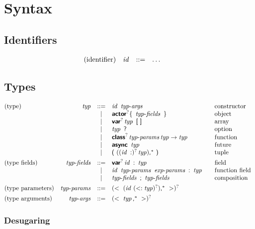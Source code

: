 
\section{Syntax}

\subsection*{Identifiers}

$$
\begin{array}{@{}lrcl@{\qquad}l}
\text{(identifier)} & \x{id} &::=&
  \dots \\
\end{array}
$$


\subsection*{Types}

$$
\begin{array}{@{}lrcl@{\qquad}l}
\text{(type)} & \x{typ} &::=&
  \x{id}~\x{typ-args}
    & \text{constructor} \\&&|&
  \KK{actor}^? \K\{~\x{typ-fields}~\K\}
    & \text{object} \\&&|&
  \KK{var}^? \x{typ}~\K[~\K]
    & \text{array} \\&&|&
  \x{typ}~\K?
    & \text{option} \\&&|&
 \KK{class}^?  \x{typ-params} \x{typ} \Kto \x{typ}
    & \text{function} \\&&|&
  \KK{async}~\x{typ}
    & \text{future} \\&&|&
  \K(~( (\x{id}~\K:)^? \x{typ})\K,^\ast~\K)
    & \text{tuple} \\
[1ex]
\text{(type fields)} & \x{typ-fields} &::=&
  \KK{var}^? \x{id}~\K:~\x{typ}
    & \text{field} \\&&|&
  \x{id}~\x{typ-params}~\x{exp-params}~\K:~\x{typ}
    & \text{function field} \\&&|&
  \x{typ-fields}~\K;~\x{typ-fields}
    & \text{composition} \\
[1ex]
\text{(type parameters)} & \x{typ-params} &::=&
  (\Klt~(\x{id}~(\Ksub \x{typ})^?)\K,^\ast~\Kgt)^? \\
[1ex]
\text{(type arguments)} & \x{typ-args} &::=&
  (\Klt~\x{typ}\K,^\ast~\Kgt)^? \\
\end{array}
$$

\subsubsection*{Desugaring}

